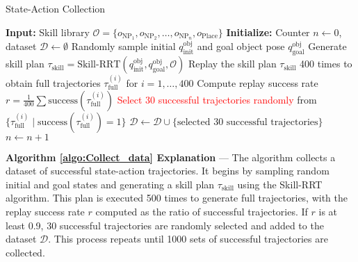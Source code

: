 \begin{algorithm}[H]
\caption{State-Action Collection}\label{algo:Collect_data}
\begin{algorithmic}[1]
\State \textbf{Input:} Skill library ${\mathcal{O}} = \{o_{\text{NP}_1}, o_{\text{NP}_2}, \ldots, o_{\text{NP}_n}, o_{\text{Place}}\}$
\State \textbf{Initialize:} Counter $n \leftarrow 0$, dataset $\mathcal{D} \leftarrow \emptyset$
    \State Randomly sample initial $q^\text{obj}_{\text{init}}$ and goal object pose $q^\text{obj}_{\text{goal}}$
    \State Generate skill plan $\tau_{\text{skill}} = \text{Skill-RRT}(q^\text{obj}_{\text{init}}, q^\text{obj}_{\text{goal}}, {\mathcal{O}})$
    \State Replay the skill plan $\tau_{\text{skill}}$ 400 times to obtain full trajectories $\tau_{\text{full}}^{(i)}$ for $i = 1, \ldots, 400$
    \State Compute replay success rate $r = \frac{1}{400} \sum \text{success}(\tau_{\text{full}}^{(i)})$
        \State \textcolor{red}{Select 30 successful trajectories randomly} from $\{\tau_{\text{full}}^{(i)} \mid \text{success}(\tau_{\text{full}}^{(i)}) = 1\}$
        \State $\mathcal{D} \leftarrow \mathcal{D} \cup \{\text{selected 30 successful trajectories}\}$
        \State $n \leftarrow n + 1$
    \EndIf
\EndWhile
\end{algorithmic}
\end{algorithm}
\begin{flushleft}
\footnotesize
\textbf{Algorithm \ref{algo:Collect_data} Explanation} — The algorithm collects a dataset of successful state-action trajectories. It begins by sampling random initial and goal states and generating a skill plan $\tau_{\text{skill}}$ using the Skill-RRT algorithm. This plan is executed 500 times to generate full trajectories, with the replay success rate $r$ computed as the ratio of successful trajectories. If $r$ is at least 0.9, 30 successful trajectories are randomly selected and added to the dataset $\mathcal{D}$. This process repeats until 1000 sets of successful trajectories are collected.
\end{flushleft}
